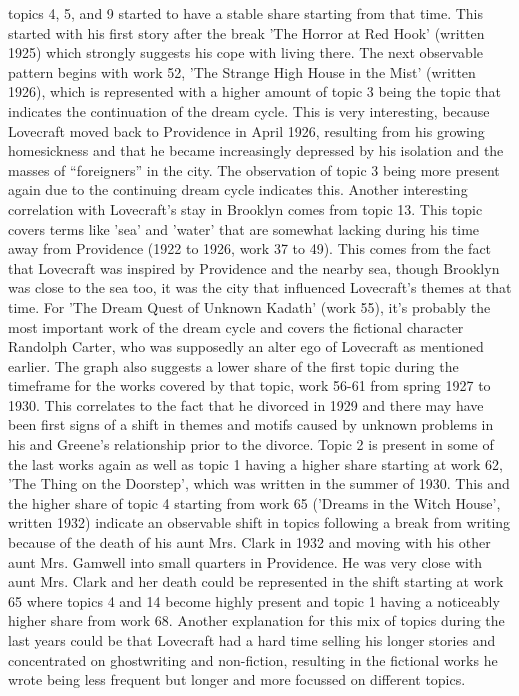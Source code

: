 topics 4, 5, and 9 started to have a stable share starting from that time. This started with his 
first story after the break 'The Horror at Red Hook' (written 1925) which strongly suggests his 
cope with living there. The next observable pattern begins with work 52, 'The Strange High House 
in the Mist' (written 1926), which is represented with a higher amount of topic 3 being the topic 
that indicates the continuation of the dream cycle. This is very interesting, because Lovecraft 
moved back to Providence in April 1926, resulting from his growing homesickness and that he became 
increasingly depressed by his isolation and the masses of “foreigners” in the city. The observation 
of topic 3 being more present again due to the continuing dream cycle indicates this. Another 
interesting correlation with Lovecraft's stay in Brooklyn comes from topic 13. This topic covers 
terms like 'sea' and 'water' that are somewhat lacking during his time away from Providence (1922 
to 1926, work 37 to 49). This comes from the fact that Lovecraft was inspired by Providence and 
the nearby sea, though Brooklyn was close to the sea too, it was the city that influenced Lovecraft's 
themes at that time. For 'The Dream Quest of Unknown Kadath' (work 55), it's probably the most 
important work of the dream cycle and covers the fictional character Randolph Carter, who was 
supposedly an alter ego of Lovecraft as mentioned earlier. The graph also suggests a lower share 
of the first topic during the timeframe for the works covered by that topic, work 56-61 from spring 
1927 to 1930. This correlates to the fact that he divorced in 1929 and there may have been first 
signs of a shift in themes and motifs caused by unknown problems in his and Greene's relationship 
prior to the divorce. Topic 2 is present in some of the last works again as well as topic 1 having 
a higher share starting at work 62, 'The Thing on the Doorstep', which was written in the summer of 
1930. This and the higher share of topic 4 starting from work 65 ('Dreams in the Witch House', written 
1932) indicate an observable shift in topics following a break from writing because of the death of 
his aunt Mrs. Clark in 1932 and moving with his other aunt Mrs. Gamwell into small quarters in 
Providence. He was very close with aunt Mrs. Clark and her death could be represented in the shift 
starting at work 65 where topics 4 and 14 become highly present and topic 1 having a noticeably 
higher share from work 68. Another explanation for this mix of topics during the last years could 
be that Lovecraft had a hard time selling his longer stories and concentrated on ghostwriting and 
non-fiction, resulting in the fictional works he wrote being less frequent but longer and more 
focussed on different topics.\\

